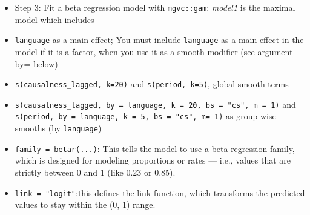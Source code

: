 \documentclass[
]{article}
\newenvironment{Shaded}{\begin{snugshade}}{\end{snugshade}}
\newcommand{\CommentTok}[1]{\textcolor[rgb]{0.56,0.35,0.01}{\textit{#1}}}
\newcommand{\FunctionTok}[1]{\textcolor[rgb]{0.13,0.29,0.53}{\textbf{#1}}}
\newcommand{\NormalTok}[1]{#1}
\newcommand{\OtherTok}[1]{\textcolor[rgb]{0.56,0.35,0.01}{#1}}
\newcommand{\SpecialCharTok}[1]{\textcolor[rgb]{0.81,0.36,0.00}{\textbf{#1}}}
\begin{document}
\begin{Shaded}
\end{Shaded}

\begin{itemize}
\item
  Step 3: Fit a beta regression model with \texttt{mgvc::gam}:
  \emph{model1} is the maximal model which includes
\item
  \texttt{language} as a main effect; You must include \texttt{language}
  as a main effect in the model if it is a factor, when you use it as a
  smooth modifier (see argument by= below)
\item
  \texttt{s(causalness\_lagged,\ k=20)} and \texttt{s(period,\ k=5)},
  global smooth terms
\item
  \texttt{s(causalness\_lagged,\ by\ =\ language,\ k\ =\ 20,\ bs\ =\ "cs",\ m\ =\ 1)}
  and
  \texttt{s(period,\ by\ =\ language,\ k\ =\ 5,\ bs\ =\ "cs",\ m=\ 1)}
  as group-wise smooths (by \texttt{language})
\item
  \texttt{family\ =\ betar(...)}: This tells the model to use a beta
  regression family, which is designed for modeling proportions or rates
  --- i.e., values that are strictly between 0 and 1 (like 0.23 or
  0.85).
\item
  \texttt{link\ =\ "logit"}:this defines the link function, which
  transforms the predicted values to stay within the (0, 1) range.
\end{itemize}
\end{document}
